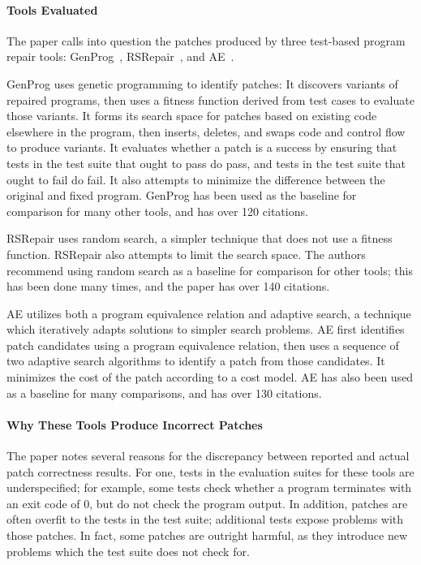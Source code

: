 \paragraph{Tools Evaluated}
The paper calls into question
the patches produced by three test-based program repair tools:
GenProg~\cite{LeGoues:2012:SSA:2337223.2337225}, RSRepair~\cite{Qi:2014:SRS:2568225.2568254}, and AE~\cite{Weimer:2013:LPE:3107656.3107702}.

GenProg uses genetic programming to identify patches: It discovers variants of repaired programs, then uses a fitness function derived from test cases
to evaluate those variants. It forms its search space for patches based on existing code elsewhere in the program,
then inserts, deletes, and swaps code and control flow to produce variants. It evaluates whether a patch is
a success by ensuring that tests in the test suite that ought to pass do pass, and tests in the test suite that ought to fail do fail.
It also attempts to minimize the difference between the original and fixed program.
GenProg has been used as the baseline for comparison for many other tools, and has over 120 citations.

RSRepair uses random search, a simpler technique that does not use a fitness function. %
RSRepair also attempts to limit the search space.
The authors recommend using random search as a baseline for comparison for other tools;
this has been done many times, and the paper has over 140 citations.

AE utilizes both a program equivalence relation and %
adaptive search, a technique which iteratively adapts solutions to simpler search problems.
AE first identifies patch candidates using a program equivalence relation, then uses a sequence of 
two adaptive search algorithms to identify a patch from those candidates.
It minimizes the cost of the patch according to a cost model.
AE has also been used as a baseline for many comparisons, and has over 130 citations.

\paragraph{Why These Tools Produce Incorrect Patches}
The paper notes several reasons for the discrepancy 
between reported and actual patch correctness results. For one, tests in the evaluation suites for these tools
are underspecified; for example, some tests check whether
a program terminates with an exit code of 0, but do not check the program output.
In addition, patches are often overfit to the tests in the test suite; additional tests expose problems with those patches.
In fact, some patches are outright harmful, as they introduce new problems which the test suite
does not check for.

